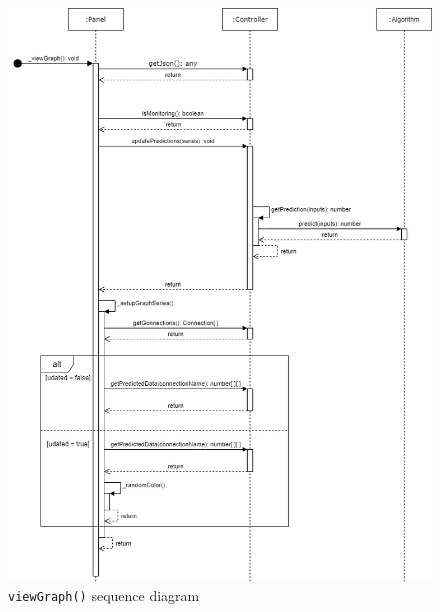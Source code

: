 \begin{center}
\begin{figure}[H]
\centering
\includegraphics[scale=0.55]{../../../Diagrams/Sequence_diagrams/viewGraph.png}
\caption{\texttt{viewGraph()} sequence diagram}
\end{figure}
\end{center}